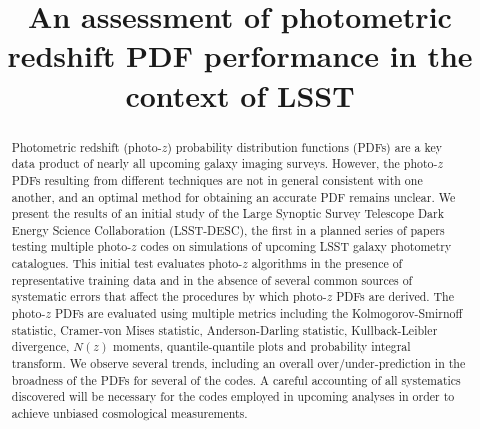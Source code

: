 \documentclass[\docopts]{\docclass}
\begin{document}
\linenumbers

\title{An assessment of photometric redshift PDF performance in the context of LSST}

\maketitlepre

\begin{abstract}

  Photometric redshift (photo-$z$) probability distribution functions (PDFs) are a key data product of nearly all upcoming galaxy imaging surveys.
  However, the photo-$z$ PDFs resulting from different techniques are not in general consistent with one another, and an optimal method for obtaining an accurate PDF remains unclear.
  We present the results of an initial study of the Large Synoptic Survey Telescope Dark Energy Science Collaboration (\textsc{LSST-DESC}), the first in a planned series of papers testing multiple photo-$z$ codes on simulations of upcoming LSST galaxy photometry catalogues.
  This initial test evaluates photo-$z$ algorithms in the presence of representative training data and in the absence of several common sources of systematic errors that affect the procedures by which photo-$z$ PDFs are derived.
  The photo-$z$ PDFs are evaluated using multiple metrics including the Kolmogorov-Smirnoff statistic, Cramer-von Mises statistic, Anderson-Darling statistic, Kullback-Leibler divergence, $N(z)$ moments, quantile-quantile plots and probability integral transform.
  We observe several trends, including an overall over/under-prediction in the broadness of the PDFs for several of the codes.
  A careful accounting of all systematics discovered will be necessary for the codes employed in upcoming analyses in order to achieve unbiased cosmological measurements.

\end{abstract}
\end{document}
